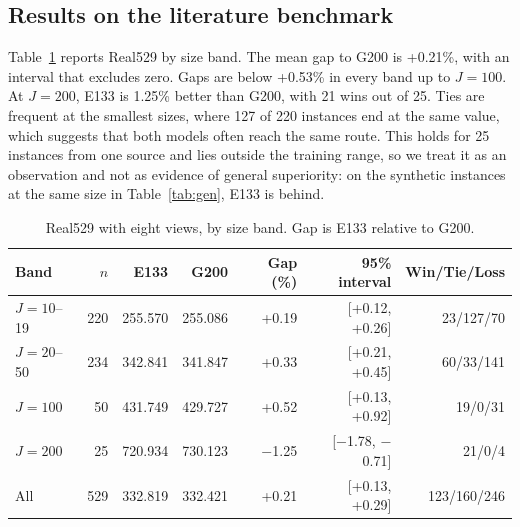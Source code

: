 \documentclass[preprint,12pt,authoryear]{elsarticle}
\begin{document}
\subsection{Results on the literature benchmark}
\label{sec:real}

Table~\ref{tab:real} reports Real529 by size band. The mean gap to G200 is +0.21\%, with an interval that excludes zero. Gaps are below +0.53\% in every band up to $J = 100$. At $J = 200$, E133 is 1.25\% better than G200, with 21 wins out of 25. Ties are frequent at the smallest sizes, where 127 of 220 instances end at the same value, which suggests that both models often reach the same route. This holds for 25 instances from one source and lies outside the training range, so we treat it as an observation and not as evidence of general superiority: on the synthetic instances at the same size in Table~\ref{tab:gen}, E133 is behind.

\begin{table}[t]
\centering
\caption{Real529 with eight views, by size band. Gap is E133 relative to G200.}
\label{tab:real}
\small
\begin{tabular}{lrrrrrr}
\toprule
Band & $n$ & E133 & G200 & Gap (\%) & 95\% interval & Win/Tie/Loss \\
\midrule
$J = 10$--19 & 220 & 255.570 & 255.086 & +0.19 & [+0.12, +0.26] & 23/127/70 \\
$J = 20$--50 & 234 & 342.841 & 341.847 & +0.33 & [+0.21, +0.45] & 60/33/141 \\
$J = 100$ & 50 & 431.749 & 429.727 & +0.52 & [+0.13, +0.92] & 19/0/31 \\
$J = 200$ & 25 & 720.934 & 730.123 & $-$1.25 & [$-$1.78, $-$0.71] & 21/0/4 \\
All & 529 & 332.819 & 332.421 & +0.21 & [+0.13, +0.29] & 123/160/246 \\
\bottomrule
\end{tabular}
\end{table}
\end{document}
